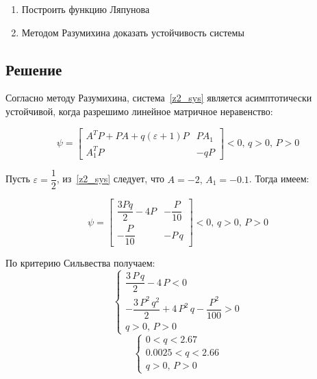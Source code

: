     \begin{enumerate}
        \item Построить функцию Ляпунова
        \item Методом Разумихина доказать устойчивость системы
    \end{enumerate}

    \subsection*{Решение}
    Согласно методу Разумихина, система~\eqref{z2_sys} является асимптотически устойчивой,
    когда разрешимо линейное матричное неравенство:

    \begin{equation}
        \psi =
        \begin{bmatrix}
            A^T P+PA+q\left(\varepsilon+1\right)P & PA_{1}\\
            A_{1}^T P & -qP
        \end{bmatrix}
        < 0,\,q>0,\,P>0
    \end{equation}

    Пусть $\varepsilon = \dfrac{1}{2}$, из~\eqref{z2_sys} следует, что $A = -2,\,A_1=-0.1$. Тогда имеем:

    \begin{equation}
        \psi =
        \begin{bmatrix}
            \dfrac{3Pq}{2}-4P & -\dfrac{P}{10}\\
            -\dfrac{P}{10} & -P\,q
        \end{bmatrix}
        < 0,\,q>0,\,P>0
    \end{equation}

    По критерию Сильвества получаем:
    \begin{equation}
        \left\{
        \begin{aligned}
            \dfrac{3\,P\,q}{2}-4\,P < 0\\
            -\dfrac{3\,P^2\,q^2}{2}+4\,P^2\,q-\dfrac{P^2}{100} > 0\\
            q>0,\,P>0
        \end{aligned}
        \right.
    \end{equation}
    \begin{equation}
        \left\{
        \begin{aligned}
            0 < q < 2.67\\
            0.0025 < q < 2.66\\
            q>0,\,P>0
        \end{aligned}
        \right.
    \end{equation}

